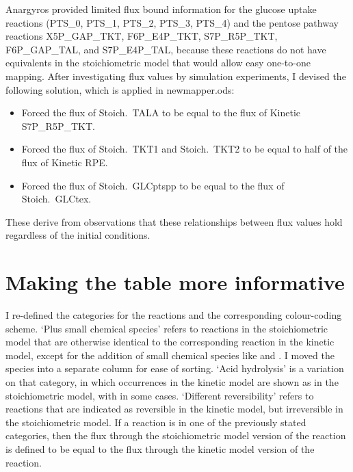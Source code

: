 \documentclass[parskip=full]{scrreprt}
\begin{document}
Anargyros provided limited flux bound information for the glucose uptake reactions (PTS\_0, PTS\_1, PTS\_2, PTS\_3, PTS\_4) and the pentose pathway reactions X5P\_GAP\_TKT, F6P\_E4P\_TKT, S7P\_R5P\_TKT, F6P\_GAP\_TAL, and S7P\_E4P\_TAL, because these reactions do not have equivalents in the stoichiometric model that would allow easy one-to-one mapping. After investigating flux values by simulation experiments, I devised the following solution, which is applied in newmapper.ods:

\begin{itemize}
\item Forced the flux of Stoich.\ TALA to be equal to the flux of Kinetic S7P\_R5P\_TKT.
\item Forced the flux of Stoich.\ TKT1 and Stoich.\ TKT2 to be equal to half of the flux of Kinetic RPE.
\item Forced the flux of Stoich.\ GLCptspp to be equal to the flux of Stoich.\ GLCtex.
\end{itemize}

These derive from observations that these relationships between flux values hold regardless of the initial conditions.

\chapter{Making the table more informative}
\label{ch:moreinformative}

I re-defined the categories for the reactions and the corresponding colour-coding scheme. `Plus small chemical species' refers to reactions in the stoichiometric model that are otherwise identical to the corresponding reaction in the kinetic model, except for the addition of small chemical species like  and . I moved the species into a separate column for ease of sorting. `Acid hydrolysis' is a variation on that category, in which  occurrences in the kinetic model are shown as  in the stoichiometric model, with  in some cases. `Different reversibility' refers to reactions that are indicated as reversible in the kinetic model, but irreversible in the stoichiometric model. If a reaction is in one of the previously stated categories, then the flux through the stoichiometric model version of the reaction is defined to be equal to the flux through the kinetic model version of the reaction.
\end{document}

